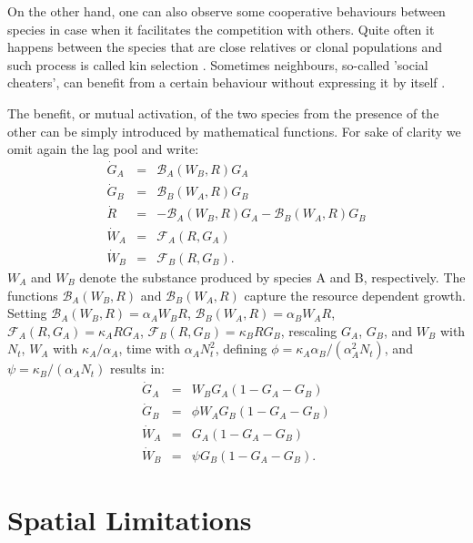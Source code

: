 \documentclass[10pt,A4paper]{article}
\begin{document}
On the other hand, one can also observe some cooperative behaviours between species in case when it facilitates the competition with others.
Quite often it happens between the species that are close relatives or clonal populations and such process is called kin selection \cite{west_social_2007}.
Sometimes neighbours, so-called 'social cheaters', can benefit from a certain behaviour without expressing it by itself \cite{rainey_evolution_2003}.



The benefit, or mutual activation, of the two species from the presence of the other can be simply introduced by mathematical functions. 
For sake of clarity we omit again the lag pool and write:
\begin{eqnarray}
\dot{G}_A &=& \mathcal{B}_A(W_B,R)G_A\\
\dot{G}_B &=& \mathcal{B}_B(W_A,R)G_B\\
\dot{R} &=&-\mathcal{B}_A(W_B,R)G_A-\mathcal{B}_B(W_A,R)G_B\\
\dot{W}_A &=& \mathcal{F}_A(R,G_A)\\
\dot{W}_B &=& \mathcal{F}_B(R,G_B).
\end{eqnarray}
$W_A$ and $W_B$ denote the substance produced by species A and B, respectively. 
The functions $\mathcal{B}_A(W_B,R)$ and $\mathcal{B}_B(W_A,R)$ capture the resource dependent growth. 
Setting $\mathcal{B}_A(W_B,R)=\alpha_A W_BR$, $\mathcal{B}_B(W_A,R)=\alpha_B W_AR$, $\mathcal{F}_A(R,G_A)=\kappa_A RG_A$, $\mathcal{F}_B(R,G_B)=\kappa_B RG_B$, rescaling $G_A$, $G_B$, and $W_B$ with $N_t$, $W_A$ with $\kappa_A/\alpha_A$, time with $\alpha_AN_t^2$, defining $\phi=\kappa_A\alpha_B/(\alpha_A^2N_t)$, and $\psi=\kappa_B/(\alpha_A N_t)$ results in: 
\begin{eqnarray}
\dot{G}_A &=& W_BG_A\left(1 - G_A-G_B\right )\\
\dot{G}_B &=& \phi W_AG_B\left(1 - G_A-G_B\right )\\
\dot{W}_A &=& G_A\left(1 - G_A-G_B\right )\\
\dot{W}_B &=&\psi G_B\left(1 - G_A-G_B\right ).
\end{eqnarray}

\section{Spatial Limitations}
\end{document}
